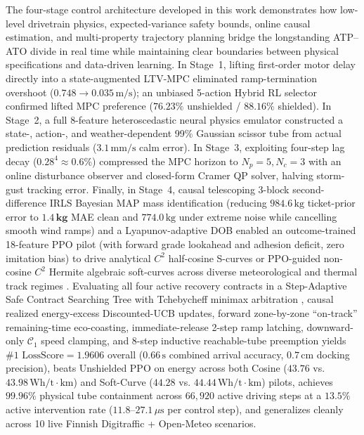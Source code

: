 \documentclass[10pt,a4paper]{article}
\begin{document}
The four-stage control architecture developed in this work demonstrates how low-level drivetrain physics, expected-variance safety bounds, online causal estimation, and multi-property trajectory planning bridge the longstanding ATP--ATO divide in real time while maintaining clear boundaries between physical specifications and data-driven learning. In Stage~1, lifting first-order motor delay directly into a state-augmented LTV-MPC eliminated ramp-termination overshoot ($0.748 \to 0.035\,\text{m/s}$); an unbiased 5-action Hybrid RL selector confirmed lifted MPC preference ($76.23\%$ unshielded / $88.16\%$ shielded). In Stage~2, a full 8-feature heteroscedastic neural physics emulator constructed a state-, action-, and weather-dependent 99\% Gaussian scissor tube from actual prediction residuals ($3.1\,\text{mm/s}$ calm error). In Stage~3, exploiting four-step lag decay ($0.28^4 \approx 0.6\%$) compressed the MPC horizon to $N_p=5, N_c=3$ with an online disturbance observer and closed-form Cramer QP solver, halving storm-gust tracking error. Finally, in Stage~4, causal telescoping 3-block second-difference IRLS Bayesian MAP mass identification (reducing $984.6\,\text{kg}$ ticket-prior error to $\mathbf{1.4\,\text{kg}}$ MAE clean and $774.0\,\text{kg}$ under extreme noise while cancelling smooth wind ramps) and a Lyapunov-adaptive DOB enabled an outcome-trained 18-feature PPO pilot (with forward grade lookahead and adhesion deficit, zero imitation bias) to drive analytical $C^2$ half-cosine S-curves or PPO-guided non-cosine $C^2$ Hermite algebraic soft-curves across diverse meteorological and thermal track regimes \cite{ref15, ref16, ref18, ref21, ref22, ref27, ref28}. Evaluating all four active recovery contracts in a Step-Adaptive Safe Contract Searching Tree \cite{ref22} with Tchebycheff minimax arbitration \cite{ref21}, causal realized energy-excess Discounted-UCB updates, forward zone-by-zone ``on-track'' remaining-time eco-coasting, immediate-release 2-step ramp latching, downward-only $\mathcal{C}_1$ speed clamping, and 8-step inductive reachable-tube preemption \cite{ref18} yields $\text{\#1 LossScore} = \mathbf{1.9606}$ overall ($0.66\,\text{s}$ combined arrival accuracy, $0.7\,\text{cm}$ docking precision), beats Unshielded PPO on energy across both Cosine ($43.76$ vs. $43.98\,\text{Wh/t}\cdot\text{km}$) and Soft-Curve ($44.28$ vs. $44.44\,\text{Wh/t}\cdot\text{km}$) pilots, achieves $99.96\%$ physical tube containment across $66,920$ active driving steps at a $13.5\%$ active intervention rate ($11.8\text{--}27.1\,\mu\text{s}$ per control step), and generalizes cleanly across 10 live Finnish Digitraffic + Open-Meteo scenarios.
\end{document}
